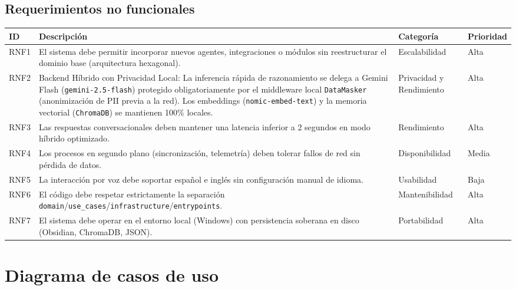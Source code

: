 \documentclass[11pt,a4paper]{article}
\begin{document}
\subsection{Requerimientos no funcionales}

\begin{longtable}{@{}p{1.3cm}p{8.2cm}p{2.4cm}p{1.5cm}@{}}
\toprule
ID & Descripción & Categoría & Prioridad \\
\midrule
\endhead
RNF1 & El sistema debe permitir incorporar nuevos agentes, integraciones o módulos sin reestructurar el dominio base (arquitectura hexagonal). & Escalabilidad & Alta \\
RNF2 & Backend Híbrido con Privacidad Local: La inferencia rápida de razonamiento se delega a Gemini Flash (\texttt{gemini-2.5-flash}) protegido obligatoriamente por el middleware local \texttt{DataMasker} (anonimización de PII previa a la red). Los embeddings (\texttt{nomic-embed-text}) y la memoria vectorial (\texttt{ChromaDB}) se mantienen 100\% locales. & Privacidad y Rendimiento & Alta \\
RNF3 & Las respuestas conversacionales deben mantener una latencia inferior a 2 segundos en modo híbrido optimizado. & Rendimiento & Alta \\
RNF4 & Los procesos en segundo plano (sincronización, telemetría) deben tolerar fallos de red sin pérdida de datos. & Disponibilidad & Media \\
RNF5 & La interacción por voz debe soportar español e inglés sin configuración manual de idioma. & Usabilidad & Baja \\
RNF6 & El código debe respetar estrictamente la separación \texttt{domain}/\texttt{use\_cases}/\texttt{infrastructure}/\texttt{entrypoints}. & Mantenibilidad & Alta \\
RNF7 & El sistema debe operar en el entorno local (Windows) con persistencia soberana en disco (Obsidian, ChromaDB, JSON). & Portabilidad & Alta \\
\bottomrule
\end{longtable}

\section{Diagrama de casos de uso}
\end{document}
